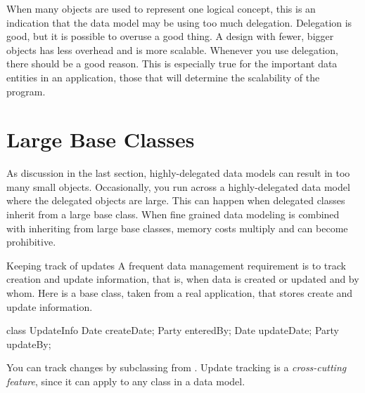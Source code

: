 When many objects are used to represent one logical concept, this is an indication that the data model may be using too much delegation. Delegation is good, but it is possible to overuse a good thing.  A design with fewer, bigger objects has less overhead and is more scalable. Whenever you use delegation, there should be a good reason. This is especially true for the important data entities in an application, those that will determine the scalability of the program.  
 
\section{Large Base Classes}

As discussion in the last section, highly-delegated data models can result in too many small objects. Occasionally, you run across a highly-delegated data model where the delegated objects are large. This can happen when delegated classes inherit from a large base class. When fine grained data modeling is combined with inheriting from large base classes, memory costs multiply and can become prohibitive. 

\begin{example}{Keeping track of updates} 
A frequent data management requirement is to track creation and update information, that is, when data is created or updated and by whom.  Here is a base class, taken from a real application, that stores create and update information.  
\begin{shortlisting}
class UpdateInfo {
     Date createDate;
     Party enteredBy;
     Date updateDate;
     Party updateBy;
}
\end{shortlisting}
You can track changes by subclassing from . Update tracking is
a \textit{cross-cutting feature}, since it can apply to any class in a data model.
\end{example}


